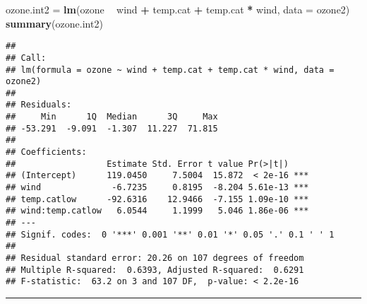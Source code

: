 \documentclass[]{article}
\newenvironment{Shaded}{\begin{snugshade}}{\end{snugshade}}
\newcommand{\DataTypeTok}[1]{\textcolor[rgb]{0.13,0.29,0.53}{#1}}
\newcommand{\KeywordTok}[1]{\textcolor[rgb]{0.13,0.29,0.53}{\textbf{#1}}}
\newcommand{\NormalTok}[1]{#1}
\newcommand{\OperatorTok}[1]{\textcolor[rgb]{0.81,0.36,0.00}{\textbf{#1}}}
\newcommand{\StringTok}[1]{\textcolor[rgb]{0.31,0.60,0.02}{#1}}
\begin{document}
\begin{Shaded}
\begin{Highlighting}[]
\NormalTok{ozone.int2 =}\StringTok{ }\KeywordTok{lm}\NormalTok{(ozone }\OperatorTok{~}\StringTok{ }\NormalTok{wind }\OperatorTok{+}\StringTok{ }\NormalTok{temp.cat }\OperatorTok{+}\StringTok{ }\NormalTok{temp.cat }\OperatorTok{*}\StringTok{ }\NormalTok{wind, }\DataTypeTok{data =}\NormalTok{ ozone2)}
\KeywordTok{summary}\NormalTok{(ozone.int2)}
\end{Highlighting}
\end{Shaded}

\begin{verbatim}
## 
## Call:
## lm(formula = ozone ~ wind + temp.cat + temp.cat * wind, data = ozone2)
## 
## Residuals:
##     Min      1Q  Median      3Q     Max 
## -53.291  -9.091  -1.307  11.227  71.815 
## 
## Coefficients:
##                  Estimate Std. Error t value Pr(>|t|)    
## (Intercept)      119.0450     7.5004  15.872  < 2e-16 ***
## wind              -6.7235     0.8195  -8.204 5.61e-13 ***
## temp.catlow      -92.6316    12.9466  -7.155 1.09e-10 ***
## wind:temp.catlow   6.0544     1.1999   5.046 1.86e-06 ***
## ---
## Signif. codes:  0 '***' 0.001 '**' 0.01 '*' 0.05 '.' 0.1 ' ' 1
## 
## Residual standard error: 20.26 on 107 degrees of freedom
## Multiple R-squared:  0.6393, Adjusted R-squared:  0.6291 
## F-statistic:  63.2 on 3 and 107 DF,  p-value: < 2.2e-16
\end{verbatim}

\normalsize

\begin{center}\rule{0.5\linewidth}{\linethickness}\end{center}

\footnotesize
\end{document}
